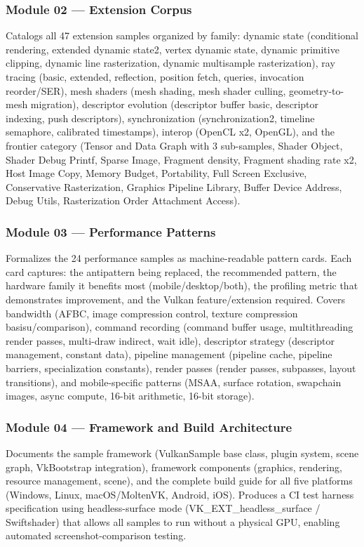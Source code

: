 \documentclass[11pt,letterpaper]{article}
\begin{document}
\subsubsection{Module 02 --- Extension Corpus}
Catalogs all 47 extension samples organized by family: dynamic state (conditional rendering, extended dynamic state2, vertex dynamic state, dynamic primitive clipping, dynamic line rasterization, dynamic multisample rasterization), ray tracing (basic, extended, reflection, position fetch, queries, invocation reorder/SER), mesh shaders (mesh shading, mesh shader culling, geometry-to-mesh migration), descriptor evolution (descriptor buffer basic, descriptor indexing, push descriptors), synchronization (synchronization2, timeline semaphore, calibrated timestamps), interop (OpenCL x2, OpenGL), and the frontier category (Tensor and Data Graph with 3 sub-samples, Shader Object, Shader Debug Printf, Sparse Image, Fragment density, Fragment shading rate x2, Host Image Copy, Memory Budget, Portability, Full Screen Exclusive, Conservative Rasterization, Graphics Pipeline Library, Buffer Device Address, Debug Utils, Rasterization Order Attachment Access).

\subsubsection{Module 03 --- Performance Patterns}
Formalizes the 24 performance samples as machine-readable pattern cards. Each card captures: the antipattern being replaced, the recommended pattern, the hardware family it benefits most (mobile/desktop/both), the profiling metric that demonstrates improvement, and the Vulkan feature/extension required. Covers bandwidth (AFBC, image compression control, texture compression basisu/comparison), command recording (command buffer usage, multithreading render passes, multi-draw indirect, wait idle), descriptor strategy (descriptor management, constant data), pipeline management (pipeline cache, pipeline barriers, specialization constants), render passes (render passes, subpasses, layout transitions), and mobile-specific patterns (MSAA, surface rotation, swapchain images, async compute, 16-bit arithmetic, 16-bit storage).

\subsubsection{Module 04 --- Framework and Build Architecture}
Documents the sample framework (VulkanSample base class, plugin system, scene graph, VkBootstrap integration), framework components (graphics, rendering, resource management, scene), and the complete build guide for all five platforms (Windows, Linux, macOS/MoltenVK, Android, iOS). Produces a CI test harness specification using headless-surface mode (VK\_EXT\_headless\_surface / Swiftshader) that allows all samples to run without a physical GPU, enabling automated screenshot-comparison testing.
\end{document}

